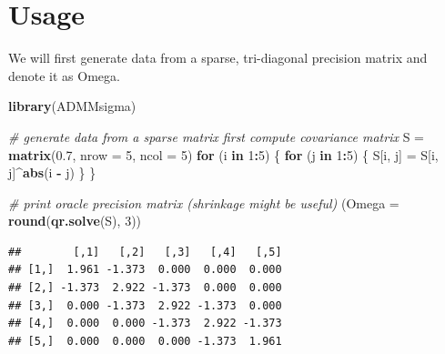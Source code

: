 \documentclass[11pt,]{book}
\newenvironment{Shaded}{\begin{snugshade}}{\end{snugshade}}
\newcommand{\CommentTok}[1]{\textcolor[rgb]{0.56,0.35,0.01}{\textit{#1}}}
\newcommand{\ControlFlowTok}[1]{\textcolor[rgb]{0.13,0.29,0.53}{\textbf{#1}}}
\newcommand{\DataTypeTok}[1]{\textcolor[rgb]{0.13,0.29,0.53}{#1}}
\newcommand{\DecValTok}[1]{\textcolor[rgb]{0.00,0.00,0.81}{#1}}
\newcommand{\FloatTok}[1]{\textcolor[rgb]{0.00,0.00,0.81}{#1}}
\newcommand{\KeywordTok}[1]{\textcolor[rgb]{0.13,0.29,0.53}{\textbf{#1}}}
\newcommand{\NormalTok}[1]{#1}
\newcommand{\OperatorTok}[1]{\textcolor[rgb]{0.81,0.36,0.00}{\textbf{#1}}}
\newcommand{\StringTok}[1]{\textcolor[rgb]{0.31,0.60,0.02}{#1}}
\theoremstyle{definition}
\theoremstyle{definition}
\theoremstyle{definition}
\theoremstyle{remark}
\begin{document}
\vspace{1cm}

\hypertarget{usage}{%
\section{Usage}\label{usage}}

We will first generate data from a sparse, tri-diagonal precision matrix
and denote it as Omega.

\vspace{0.5cm}

\begin{Shaded}
\begin{Highlighting}[]
\KeywordTok{library}\NormalTok{(ADMMsigma)}

\CommentTok{# generate data from a sparse matrix first compute covariance matrix}
\NormalTok{S =}\StringTok{ }\KeywordTok{matrix}\NormalTok{(}\FloatTok{0.7}\NormalTok{, }\DataTypeTok{nrow =} \DecValTok{5}\NormalTok{, }\DataTypeTok{ncol =} \DecValTok{5}\NormalTok{)}
\ControlFlowTok{for}\NormalTok{ (i }\ControlFlowTok{in} \DecValTok{1}\OperatorTok{:}\DecValTok{5}\NormalTok{) \{}
    \ControlFlowTok{for}\NormalTok{ (j }\ControlFlowTok{in} \DecValTok{1}\OperatorTok{:}\DecValTok{5}\NormalTok{) \{}
\NormalTok{        S[i, j] =}\StringTok{ }\NormalTok{S[i, j]}\OperatorTok{^}\KeywordTok{abs}\NormalTok{(i }\OperatorTok{-}\StringTok{ }\NormalTok{j)}
\NormalTok{    \}}
\NormalTok{\}}

\CommentTok{# print oracle precision matrix (shrinkage might be useful)}
\NormalTok{(}\DataTypeTok{Omega =} \KeywordTok{round}\NormalTok{(}\KeywordTok{qr.solve}\NormalTok{(S), }\DecValTok{3}\NormalTok{))}
\end{Highlighting}
\end{Shaded}

\begin{verbatim}
##        [,1]   [,2]   [,3]   [,4]   [,5]
## [1,]  1.961 -1.373  0.000  0.000  0.000
## [2,] -1.373  2.922 -1.373  0.000  0.000
## [3,]  0.000 -1.373  2.922 -1.373  0.000
## [4,]  0.000  0.000 -1.373  2.922 -1.373
## [5,]  0.000  0.000  0.000 -1.373  1.961
\end{verbatim}
\end{document}
